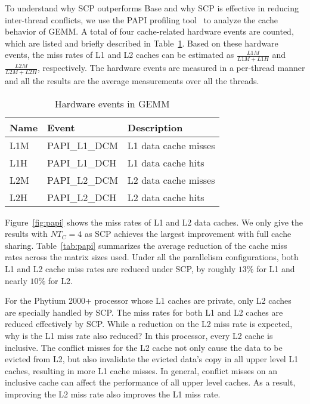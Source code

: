 To understand why SCP outperforms Base and
why SCP is effective in reducing
inter-thread conflicts, 
we use the PAPI profiling tool~\cite{papi} to
analyze the cache behavior of GEMM. A total of 
four cache-related hardware events are counted,
which are listed and briefly described in Table~\ref{tab:events}.
Based on these hardware events, the
miss rates of L1 and L2 caches can be estimated  as 
$\frac{L1M}{L1M+L1H}$ and $\frac{L2M}{L2M+L2H}$, respectively.
The hardware events are measured in a per-thread manner
and all the results are the average measurements
over all the threads.

\begin{table}
  \centering
  \caption{Hardware events in GEMM}
  \label{tab:events}
  \begin{tabular}{lll}
    \toprule
    Name & Event & Description \\
    \midrule
    L1M & PAPI\_L1\_DCM & L1 data cache misses \\
    L1H & PAPI\_L1\_DCH & L1 data cache hits \\
    L2M & PAPI\_L2\_DCM & L2 data cache misses \\
    L2H & PAPI\_L2\_DCH & L2 data cache hits \\
    \bottomrule
  \end{tabular}
\end{table}

Figure~\ref{fig:papi} shows the miss rates of L1 and L2 data caches.  We only give the results with $NT_C=4$
as SCP achieves the largest improvement with full cache sharing.
Table~\ref{tab:papi} summarizes the average reduction of the
cache miss rates across the matrix sizes used.
Under all the parallelism configurations,
both L1 and L2 cache miss rates are reduced under
SCP, 
by roughly $13\%$ for L1 and nearly $10\%$ for L2.

For the Phytium 2000+ processor whose L1 caches are private,
only L2 caches are specially handled by SCP.
The miss rates for both L1 and L2 caches
are reduced effectively by SCP.
While a reduction on the L2 miss rate is expected,
why is the L1 miss rate also reduced? In this processor,
every L2 cache is inclusive.
The conflict misses for the L2 cache not only cause
the data to be evicted from L2,
but also invalidate the evicted data's copy in all upper level L1 caches,
resulting in more L1 cache misses.
In general, conflict misses on an inclusive cache can affect
the performance of all upper level caches. As a 
result, improving the L2 miss rate also improves the
L1 miss rate.

